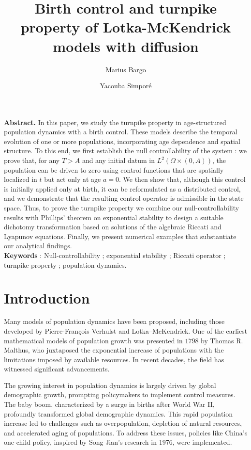 \documentclass[10pt, a4]{amsart}
\title[Birth  control and Turnpike property]{Birth  control and turnpike property of Lotka-McKendrick models with diffusion}%
\author{Marius Bargo}
\author{Yacouba Simporé}
\theoremstyle{plain}
\theoremstyle{definition}
\theoremstyle{remark}
\numberwithin{equation}{section}
\begin{document}
\maketitle
{\bf Abstract.}  In this paper, we study the turnpike property in age-structured population dynamics with a birth control. These models describe the temporal evolution of one or more populations, incorporating age dependence and spatial structure. To this end, we first establish the null controllability of the system : we prove that, for any \(T>A\) and any initial datum in \(L^2(\Omega\times(0,A))\), the population can be driven to zero using control functions that are spatially localized in \(t\) but act only at age \(a=0\). We then show that, although this control is initially applied only at birth, it can be reformulated as a distributed control, and we demonstrate that the resulting control operator is admissible in the state space.  Thus, to prove the turnpike property we combine our null-controllability results with Phillips’ theorem on exponential stability to design a suitable dichotomy transformation based on solutions of the algebraic Riccati and Lyapunov equations. Finally, we present numerical examples that substantiate our analytical findings.
\\{\bf Keywords} : Null-controllability ;  exponential stability ;  Riccati operator ; turnpike property ; population dynamics.
\section{Introduction}%
Many models of population dynamics have been proposed, including those developed by Pierre-François Verhulst and Lotka–McKendrick. One of the earliest mathematical models of population growth was presented in $1798$ by Thomas R. Malthus, who juxtaposed the exponential increase of populations with the limitations imposed by available resources. In recent decades, the field has witnessed significant advancements.

The growing interest in population dynamics is largely driven by global demographic growth, prompting policymakers to implement control measures. The baby boom, characterized by a surge in births after World War II, profoundly transformed global demographic dynamics. This rapid population increase led to challenges such as overpopulation, depletion of natural resources, and accelerated aging of populations. To address these issues, policies like China's one-child policy, inspired by Song Jian's research in 1976, were implemented.
\end{document}
